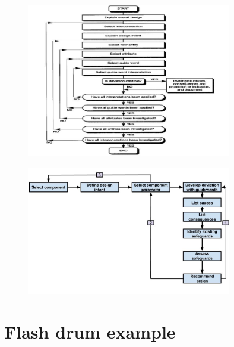 \documentclass[aspectratio=1610,pdftex,dvipsnames,compress,xcolor={dvipsnames}]{beamer}
\begin{document}
\addtocounter{framenumber}{-1}
\begin{frame}{}
    \begin{figure}
        \centering
        \includegraphics[width=0.80\textwidth]{hazop_flowchart.jpg}
    \end{figure}
\end{frame}


\begin{frame}{}
    \begin{figure}
        \centering
        \includegraphics[width=0.80\textwidth]{hazop.loop.jpg}
    \end{figure}
\end{frame}


\section{Flash drum example}
\end{document}
